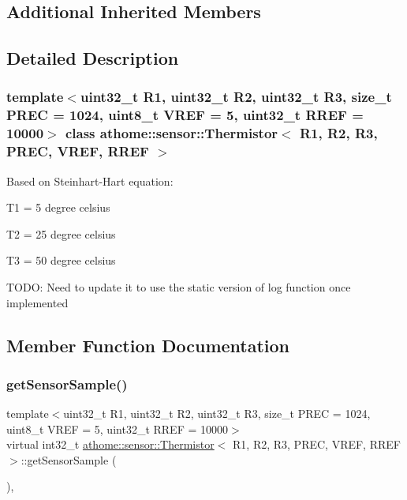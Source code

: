 \subsection*{Additional Inherited Members}


\subsection{Detailed Description}
\subsubsection*{template$<$uint32\+\_\+t R1, uint32\+\_\+t R2, uint32\+\_\+t R3, size\+\_\+t P\+R\+EC = 1024, uint8\+\_\+t V\+R\+EF = 5, uint32\+\_\+t R\+R\+EF = 10000$>$\newline
class athome\+::sensor\+::\+Thermistor$<$ R1, R2, R3, P\+R\+E\+C, V\+R\+E\+F, R\+R\+E\+F $>$}

Based on Steinhart-\/\+Hart equation\+:


\begin{DoxyItemize}
\item T1 = 5 degree celsius
\item T2 = 25 degree celsius
\item T3 = 50 degree celsius
\end{DoxyItemize}

T\+O\+DO\+: Need to update it to use the static version of log function once implemented 

\subsection{Member Function Documentation}
\mbox{\label{classathome_1_1sensor_1_1_thermistor_abc45d8d277fb186b5d303f9e53bf73d4}} 
\subsubsection{\texorpdfstring{get\+Sensor\+Sample()}{getSensorSample()}}
{\footnotesize\ttfamily template$<$uint32\+\_\+t R1, uint32\+\_\+t R2, uint32\+\_\+t R3, size\+\_\+t P\+R\+EC = 1024, uint8\+\_\+t V\+R\+EF = 5, uint32\+\_\+t R\+R\+EF = 10000$>$ \\
virtual int32\+\_\+t \mbox{\hyperlink{classathome_1_1sensor_1_1_thermistor}{athome\+::sensor\+::\+Thermistor}}$<$ R1, R2, R3, P\+R\+EC, V\+R\+EF, R\+R\+EF $>$\+::get\+Sensor\+Sample (\begin{DoxyParamCaption}{ }\end{DoxyParamCaption})\hspace{0.3cm}{\ttfamily [inline]}, {\ttfamily [virtual]}}

